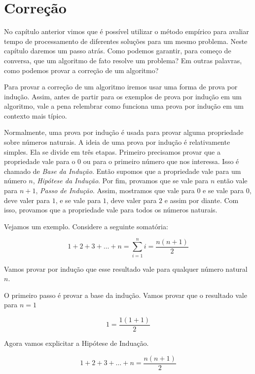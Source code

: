 \chapter{Correção}

No capítulo anterior vimos que é possível utilizar o método empírico para avaliar tempo de processamento de diferentes soluções para um mesmo problema.
Neste capítulo daremos um passo atrás.
Como podemos garantir, para começo de conversa, que um algoritmo de fato resolve um problema?
Em outras palavras, como podemos provar a correção de um algoritmo?

Para provar a correção de um algoritmo iremos usar uma forma de prova por indução.
Assim, antes de partir para os exemplos de prova por indução em um algoritmo, vale a pena relembrar como funciona uma prova por indução em um contexto mais típico.

Normalmente, uma prova por indução é usada para provar alguma propriedade sobre números naturais.
A ideia de uma prova por indução é relativamente simples.
Ela se divide em três etapas.
Primeiro precisamos provar que a propriedade vale para o $0$ ou para o primeiro número que nos interessa.
Isso é chamado de {\em Base da Indução}.
Então supomos que a propriedade vale para um número $n$, {\em Hipótese da Indução}.
Por fim, provamos que se vale para $n$ então vale para $n+1$, {\em Passo de Indução}.
Assim, mostramos que vale para $0$ e se vale para $0$, deve valer para $1$, e se vale para $1$, deve valer para $2$ e assim por diante.
Com isso, provamos que a propriedade vale para todos os números naturais.

Vejamos um exemplo.
Considere a seguinte somatória:

\begin{displaymath}
  1 + 2 + 3 + \dots + n = \sum_{i=1}^n i = \frac{n(n+1)}{2}
\end{displaymath}

Vamos provar por indução que esse resultado vale para qualquer número natural $n$.

O primeiro passo é provar a base da indução.
Vamos provar que o resultado vale para $n = 1$

\begin{displaymath}
  1 = \frac{1(1+1)}{2}
\end{displaymath}

Agora vamos explicitar a Hipótese de Induação.

\begin{displaymath}
  1 + 2 + 3 + \dots + n = \frac{n(n+1)}{2}
\end{displaymath}

